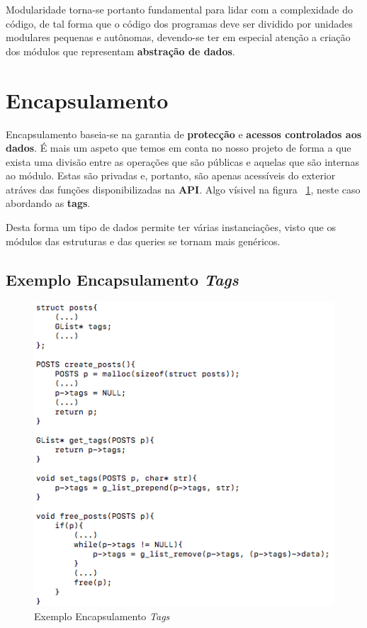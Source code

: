 \documentclass[a4paper]{article}
\begin{document}
Modularidade torna-se portanto fundamental para lidar com a complexidade
do código, de tal forma que o código dos programas deve ser dividido por
unidades modulares pequenas e autônomas, devendo-se ter em especial atenção
a criação dos módulos que representam \textbf{abstração de dados}.

\section{Encapsulamento}

Encapsulamento baseia-se na garantia de \textbf{protecção} e 
\textbf{acessos controlados aos dados}. É mais um aspeto que temos em 
conta no nosso projeto de forma a que exista uma divisão entre as operações 
que são públicas e aquelas que são internas ao módulo. Estas são privadas e,
portanto, são apenas acessíveis do exterior atráves das funções
disponibilizadas na \textbf{API}. Algo vísivel na figura 
~\ref{img:encapsulamento_posts}, neste caso abordando as \textbf{tags}.

Desta forma um tipo de dados permite ter várias instanciações,
visto que os módulos das estruturas e das queries se tornam mais genéricos.

\subsection{Exemplo Encapsulamento \textit{Tags}}
\begin{figure}[ht]
\centering
\includegraphics[scale=0.50]{image_exemplo_encapsulamento}
\caption{Exemplo Encapsulamento \textit{Tags}}
\label{img:encapsulamento_posts}
\end{figure}
\end{document}
